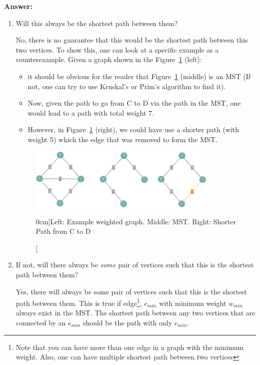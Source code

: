 \documentclass[nobib]{tufte-handout}
\newcounter{counter}
\begin{document}
\textbf{Answer:} \\ 
\begin{enumerate}
    \item Will this always be the shortest path between them?
    
    No, there is no guarantee that this would be the shortest path between this two vertices. To show this, one can look at a specific example as a counterexample. Given a graph shown in the Figure~\ref{fig:ex4_full} (left):
    \begin{itemize}
        \item it should be obvious for the reader that Figure~\ref{fig:ex4_full} (middle) is an MST (If not, one can try to use Kruskal's or Prim's algorithm to find it).
        \item Now, given the path to go from C to D via the path in the MST, one would lead to a path with total weight 7.
        \item However, in Figure~\ref{fig:ex4_full} (right), we could have use a shorter path (with weight 5) which the edge that was removed to form the MST.  
    \end{itemize}  
    
    \begin{figure}
        \centering
        \includegraphics[width=0.85\textwidth]{graphics/L6_prim_kruskal_dijkstra/ex4_full.png}
        \caption[][0cm]{Left: Example weighted graph. Middle: MST. Right: Shorter Path from C to D}
        \label{fig:ex4_full}
    \end{figure}

    \item If not, will there always be \emph{some} pair of vertices such that this is the shortest path between them?
    
    Yes, there will always be some pair of vertices such that this is the shortest path between them. This is true if edge\footnote{Note that you can have more than one edge in a graph with the minimum weight. Also, one can have multiple shortest path between two vertices}, $e_{min}$ with minimum weight $w_{min}$ always exist in the MST. The shortest path between any two vertices that are connected by an $e_{min}$ should be the path with only $e_{min}$.
    

\end{enumerate}
\end{document}
